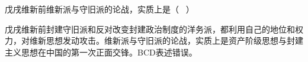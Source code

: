 \question 戊戌维新前维新派与守旧派的论战，实质上是（ ~）
\par{}
\begin{solution}戊戌维新前封建守旧派和反对改变封建政治制度的洋务派，都利用自己的地位和权力，对维新思想发动攻击。维新派与守旧派的论战，实质上是资产阶级思想与封建主义思想在中国的第一次正面交锋。BCD表述错误。
\end{solution}

